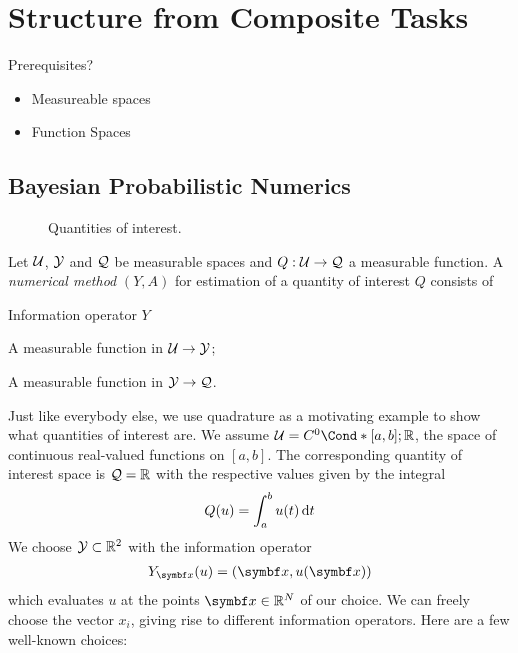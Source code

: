\chapter{Structure from Composite Tasks}
\label{cha:structure_from_composite_tasks}
Prerequisites?
\begin{itemize}
    \item Measureable spaces
    \item Function Spaces
\end{itemize}

\section{Bayesian Probabilistic Numerics}
\label{sec:probabilistic_numerics}
\begin{figure}[t]
    \centering
    
    \caption[Quantities of interest]{
        Quantities of interest.
        \label{fig:quantities_of_interest}
    }
\end{figure}
\begin{definition}
    \label{def:numerical_method}
    Let $\mathcal{U}$, $\mathcal{Y}$ and $\mathcal{Q}$ be measurable spaces and $Q: \mathcal{U} \to \mathcal{Q}$ a measurable function.
    A \emph{numerical method} $(Y, A)$ for estimation of a quantity of interest $Q$ consists of
    \begin{labeling}{Information operator $Y$\quad}
        \item[Information operator $Y$] A measurable function in $\mathcal{U} \to \mathcal{Y}$;
        \item[Estimation operator $A$] A measurable function in $\mathcal{Y} \to \mathcal{Q}$.
    \end{labeling}
\end{definition}

Just like everybody else, we use quadrature as a motivating example to show what quantities of interest are.
We assume $\Uc = \Fun*{C^0}{[a, b]; \Rb}$, the space of continuous real-valued functions on $[a, b]$.
The corresponding quantity of interest space is $\mathcal{Q} = \mathbb{R}$ with the respective values given by the integral
\begin{align}
    Q(u) = \int_a^b u(t) \mathop{}\!\mathrm{d} t
\end{align}
We choose $\mathcal{Y} \subset \mathbb{R}^2$ with the information operator
\begin{align}
    Y_{\mat{x}}(u) = \left( \mat{x}, u(\mat{x}) \right)
\end{align}
which evaluates $u$ at the points $\mat{x} \in \Rb^N$ of our choice.
We can freely choose the vector $x_i$, giving rise to different information operators.
Here are a few well-known choices:
